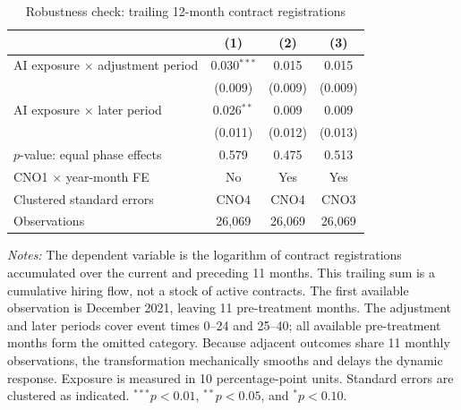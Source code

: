 \begin{table}[H]
\centering
\caption{Robustness check: trailing 12-month contract registrations}
\label{tab:v1_trailing_contracts}
\begin{threeparttable}
\small
\begin{tabular}{lccc}
\toprule
& (1) & (2) & (3) \\
\midrule
AI exposure $\times$ adjustment period & 0.030$^{***}$ & 0.015 & 0.015 \\
 & (0.009) & (0.009) & (0.009) \\
\addlinespace
AI exposure $\times$ later period & 0.026$^{**}$ & 0.009 & 0.009 \\
 & (0.011) & (0.012) & (0.013) \\
$p$-value: equal phase effects & 0.579 & 0.475 & 0.513 \\
\midrule
CNO1 $\times$ year-month FE & No & Yes & Yes \\
Clustered standard errors & CNO4 & CNO4 & CNO3 \\
Observations & 26,069 & 26,069 & 26,069 \\
\bottomrule
\end{tabular}
\begin{tablenotes}[flushleft]
\footnotesize
\item \emph{Notes:} The dependent variable is the logarithm of contract registrations accumulated over the current and preceding 11 months. This trailing sum is a cumulative hiring flow, not a stock of active contracts. The first available observation is December 2021, leaving 11 pre-treatment months. The adjustment and later periods cover event times 0--24 and 25--40; all available pre-treatment months form the omitted category. Because adjacent outcomes share 11 monthly observations, the transformation mechanically smooths and delays the dynamic response. Exposure is measured in 10 percentage-point units. Standard errors are clustered as indicated. $^{***}p<0.01$, $^{**}p<0.05$, and $^{*}p<0.10$.
\end{tablenotes}
\end{threeparttable}
\end{table}
